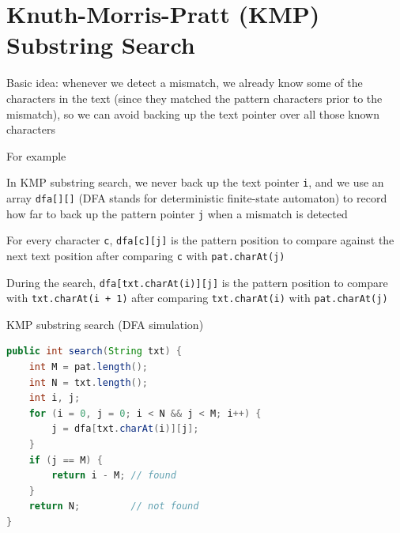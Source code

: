 \documentclass[8pt,a4paper,compress]{beamer}
\begin{document}
\section{Knuth-Morris-Pratt (KMP) Substring Search}
\begin{frame}[fragile]
\pause

Basic idea: whenever we detect a mismatch, we already know some of the characters in the text (since they matched the pattern characters
prior to the mismatch), so we can avoid backing up the text pointer over all those known characters

\pause
\bigskip

For example
\begin{center}
\end{center}
\end{frame}

\begin{frame}[fragile]
\pause

In KMP substring search, we never back up the text pointer \lstinline{i}, and we use an array \lstinline{dfa[][]} (DFA stands for deterministic finite-state automaton) to record how
far to back up the pattern pointer \lstinline{j} when a mismatch is detected

\pause
\bigskip

For every character \lstinline{c}, \lstinline{dfa[c][j]} is the pattern position to compare against the next text position after comparing \lstinline{c} with \lstinline{pat.charAt(j)}

\pause
\bigskip

During the search, \lstinline{dfa[txt.charAt(i)][j]} is the pattern position to compare with \lstinline{txt.charAt(i + 1)} after comparing \lstinline{txt.charAt(i)} with \lstinline{pat.charAt(j)}

\pause
\bigskip

KMP substring search (DFA simulation)
\begin{lstlisting}[language=Java]
public int search(String txt) { 
    int M = pat.length();
    int N = txt.length();
    int i, j;
    for (i = 0, j = 0; i < N && j < M; i++) {
        j = dfa[txt.charAt(i)][j];
    }
    if (j == M) { 
        return i - M; // found
    }
    return N;         // not found
}
\end{lstlisting}
\end{frame}
\end{document}
